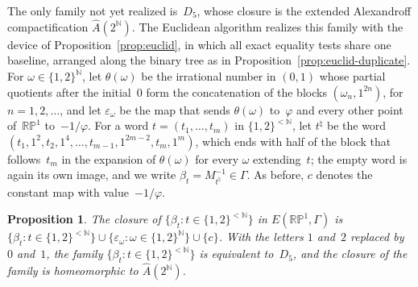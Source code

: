\documentclass[psamsfonts]{amsart}
\newtheorem{prop}[thm]{Proposition}
\theoremstyle{definition}
\theoremstyle{remark}
\newcommand{\RP}{\mathbb{R}\mathbb{P}}
\numberwithin{equation}{section}
\begin{document}
The only family not yet realized is~$D_5$, whose closure is the extended Alexandroff compactification $\hat A(2^{\mathbb{N}})$.
The Euclidean algorithm realizes this family with the device of Proposition~\ref{prop:euclid}, in which all exact equality tests share one baseline, arranged along the binary tree as in Proposition~\ref{prop:euclid-duplicate}.
For $\omega\in\{1,2\}^{\mathbb{N}}$, let $\theta(\omega)$ be the irrational number in $(0,1)$ whose partial quotients after the initial~$0$ form the concatenation of the blocks $(\omega_n,1^{2n})$, for $n=1,2,\dots$, and let $\varepsilon_\omega$ be the map that sends $\theta(\omega)$ to~$\varphi$ and every other point of~$\RP^1$ to~$-1/\varphi$.
For a word $t=(t_1,\dots,t_m)$ in $\{1,2\}^{<\mathbb{N}}$, let $t^\natural$ be the word $(t_1,1^2,t_2,1^4,\dots,t_{m-1},1^{2m-2},t_m,1^m)$, which ends with half of the block that follows~$t_m$ in the expansion of $\theta(\omega)$ for every $\omega$ extending~$t$; the empty word is again its own image, and we write $\beta_t=M_{t^\natural}^{-1}\in\Gamma$.
As before, $c$ denotes the constant map with value~$-1/\varphi$.

\begin{prop}\label{prop:euclid-fixed}
  The closure of $\{\beta_t:t\in\{1,2\}^{<\mathbb{N}}\}$ in $E(\RP^1,\Gamma)$ is $\{\beta_t:t\in\{1,2\}^{<\mathbb{N}}\}\cup\{\varepsilon_\omega:\omega\in\{1,2\}^{\mathbb{N}}\}\cup\{c\}$.
  With the letters $1$ and~$2$ replaced by $0$ and~$1$, the family $\{\beta_t:t\in\{1,2\}^{<\mathbb{N}}\}$ is equivalent to~$D_5$, and the closure of the family is homeomorphic to $\hat A(2^{\mathbb{N}})$.
\end{prop}
\end{document}
